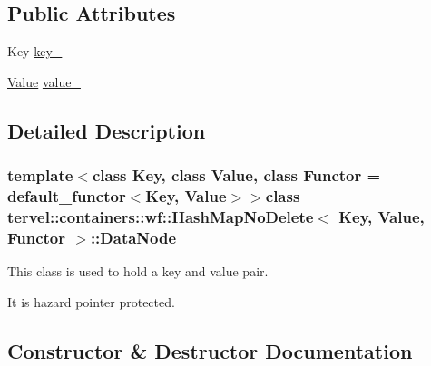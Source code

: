 \subsection*{Public Attributes}
\begin{DoxyCompactItemize}
\item 
Key \hyperlink{classtervel_1_1containers_1_1wf_1_1_hash_map_no_delete_1_1_data_node_af9ccfc5066e8ccc8c651e01f5968233e}{key\+\_\+}
\item 
\hyperlink{hash__map_2test_object_8h_ad777bf08d8e2b01df17ba5e3c51ae11f}{Value} \hyperlink{classtervel_1_1containers_1_1wf_1_1_hash_map_no_delete_1_1_data_node_a2f452c674e936fcfa45edee4b0416ea4}{value\+\_\+}
\end{DoxyCompactItemize}


\subsection{Detailed Description}
\subsubsection*{template$<$class Key, class Value, class Functor = default\+\_\+functor$<$\+Key, Value$>$$>$class tervel\+::containers\+::wf\+::\+Hash\+Map\+No\+Delete$<$ Key, Value, Functor $>$\+::\+Data\+Node}

This class is used to hold a key and value pair. 

It is hazard pointer protected. 

\subsection{Constructor \& Destructor Documentation}
\hypertarget{classtervel_1_1containers_1_1wf_1_1_hash_map_no_delete_1_1_data_node_a4cc9193f493ac699f609a8076eb47416}{}
